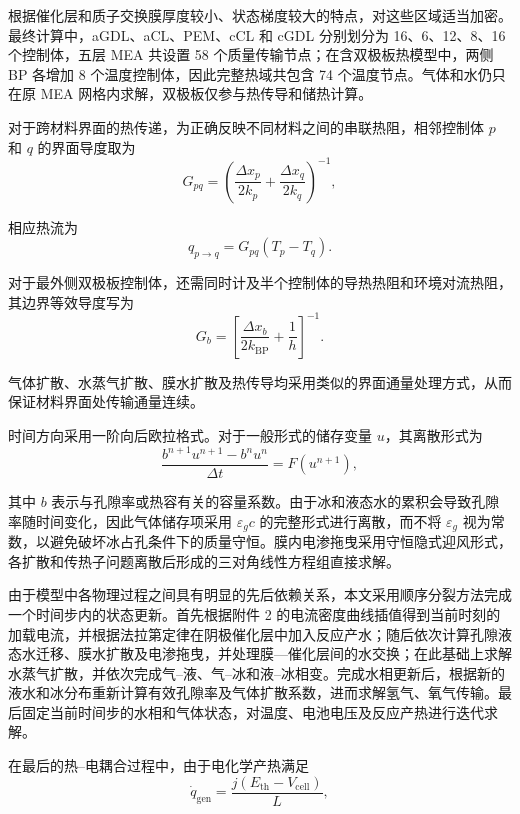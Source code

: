 \documentclass[bwprint]{gmcmthesis}
\numberwithin{figure}{section}
\begin{document}
 根据催化层和质子交换膜厚度较小、状态梯度较大的特点，对这些区域适当加密。最终计算中，aGDL、aCL、PEM、cCL 和 cGDL 分别划分为 16、6、12、8、16 个控制体，五层 MEA 共设置 58 个质量传输节点；在含双极板热模型中，两侧 BP 各增加 8 个温度控制体，因此完整热域共包含 74 个温度节点。气体和水仍只在原 MEA 网格内求解，双极板仅参与热传导和储热计算。

对于跨材料界面的热传递，为正确反映不同材料之间的串联热阻，相邻控制体 \(p\) 和 \(q\) 的界面导度取为
\begin{equation}
G_{pq} = \left( \frac{\Delta x_p}{2k_p} + \frac{\Delta x_q}{2k_q} \right)^{-1}, \tag{4-82}
\end{equation}

 相应热流为
\begin{equation}
q_{p\to q} = G_{pq}(T_p - T_q). \tag{4-83}
\end{equation}

 对于最外侧双极板控制体，还需同时计及半个控制体的导热热阻和环境对流热阻，其边界等效导度写为
\begin{equation}
G_b = \left[ \frac{\Delta x_b}{2k_{\text{BP}}} + \frac{1}{h} \right]^{-1}. \tag{4-84}
\end{equation}

 气体扩散、水蒸气扩散、膜水扩散及热传导均采用类似的界面通量处理方式，从而保证材料界面处传输通量连续。

 时间方向采用一阶向后欧拉格式。对于一般形式的储存变量 \(u\)，其离散形式为
\begin{equation}
\frac{b^{n+1}u^{n+1} - b^n u^n}{\Delta t} = F(u^{n+1}), \tag{4-85}
\end{equation}

 其中 \(b\) 表示与孔隙率或热容有关的容量系数。由于冰和液态水的累积会导致孔隙率随时间变化，因此气体储存项采用 \(\varepsilon_g c\) 的完整形式进行离散，而不将 \(\varepsilon_g\) 视为常数，以避免破坏冰占孔条件下的质量守恒。膜内电渗拖曳采用守恒隐式迎风形式，各扩散和传热子问题离散后形成的三对角线性方程组直接求解。
 
 由于模型中各物理过程之间具有明显的先后依赖关系，本文采用顺序分裂方法完成一个时间步内的状态更新。首先根据附件 2 的电流密度曲线插值得到当前时刻的加载电流，并根据法拉第定律在阴极催化层中加入反应产水；随后依次计算孔隙液态水迁移、膜水扩散及电渗拖曳，并处理膜—催化层间的水交换；在此基础上求解水蒸气扩散，并依次完成气–液、气–冰和液–冰相变。完成水相更新后，根据新的液水和冰分布重新计算有效孔隙率及气体扩散系数，进而求解氢气、氧气传输。最后固定当前时间步的水相和气体状态，对温度、电池电压及反应产热进行迭代求解。

在最后的热--电耦合过程中，由于电化学产热满足
\begin{equation}
\dot{q}_{\text{gen}} = \frac{j(E_{\text{th}} - V_{\text{cell}})}{L}, \tag{4-86}
\end{equation}
\end{document}
